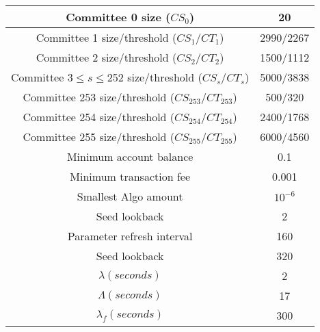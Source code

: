 \documentclass[../main.tex]{subfiles}
\begin{document}
\begin{center}
\begin{tabular}{ |c|c| } 
 \hline
 Committee 0 size ($CS_0$) & 20 \\ 
 \hline
 Committee 1 size/threshold ($CS_1/CT_1$) & 2990/2267 \\ 
 \hline
 Committee 2 size/threshold ($CS_2/CT_2$) & 1500/1112 \\ 
 \hline
 Committee 3$\leq s \leq$252 size/threshold ($CS_s/CT_s$) &  5000/3838 \\ 
 \hline
 Committee 253 size/threshold ($CS_{253}/CT_{253}$) & 500/320 \\ 
 \hline
 Committee 254 size/threshold ($CS_{254}/CT_{254}$) & 2400/1768 \\ 
 \hline
 Committee 255 size/threshold ($CS_{255}/CT_{255}$) & 6000/4560 \\ 
 \hline
 Minimum account balance & 0.1\\
 \hline
 Minimum transaction fee & 0.001\\
 \hline
 Smallest Algo amount & $10^{-6}$\\
 \hline
 Seed lookback & 2\\
 \hline
 Parameter refresh interval & 160\\
 \hline
 Seed lookback & 320\\
 \hline
 $\lambda (seconds)$ & 2\\
 \hline
 $\Lambda (seconds)$ & 17\\
 \hline
 $\lambda_f (seconds)$ & 300\\
 \hline
\end{tabular}
\end{center}
\end{document}
